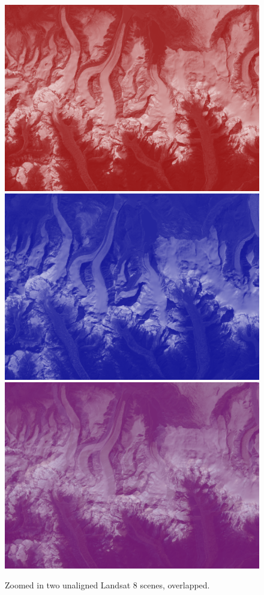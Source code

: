 \documentclass[12pt, a4paper]{report}
\begin{document}
  	\begin{figure}[H]
  		\includegraphics[width=\linewidth]{red_tiny_unaligned.png}
  		\endminipage\hfill
  		\includegraphics[width=\linewidth]{blue_tiny_unaligned.png}
  		\endminipage\hfill
  		\includegraphics[width=\linewidth]{purple_tiny_unaligned.png}
  		\endminipage
  		\caption{Zoomed in two unaligned Landsat 8 scenes, overlapped.}\label{fig:tiny_unaligned}
  	\end{figure}
  	
\end{document}
